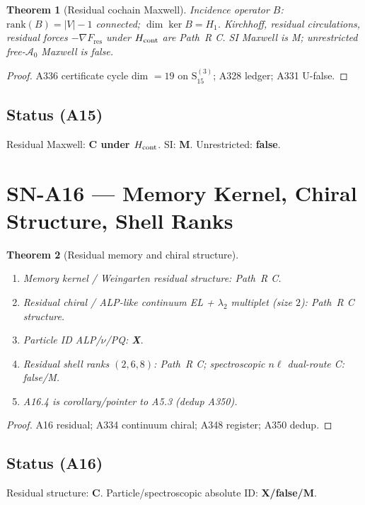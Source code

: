\documentclass[11pt,a4paper]{article}
\newtheorem{theorem}{Theorem}[section]
\theoremstyle{definition}
\begin{document}
\begin{theorem}[Residual cochain Maxwell]
\label{thm:A15}
Incidence operator $B$: $\mathrm{rank}(B)=|V|-1$ connected; $\dim\ker B=H_1$.
Kirchhoff, residual circulations, residual forces $-\nabla F_{\mathrm{res}}$ under $H_{\rm cont}$ are Path~R C.
SI Maxwell is M; unrestricted free-$\mathcal{A}_0$ Maxwell is false.
\end{theorem}

\begin{proof}
A336 certificate cycle dim $=19$ on $\mathrm{S}_{15}^{(3)}$; A328 ledger; A331 U-false.
\end{proof}

\subsection*{Status (A15)} Residual Maxwell: \textbf{C under $H_{\rm cont}$}. SI: \textbf{M}. Unrestricted: \textbf{false}.

\section{SN-A16 --- Memory Kernel, Chiral Structure, Shell Ranks}
\label{sec:SNA16}

\begin{theorem}[Residual memory and chiral structure]
\label{thm:A16}
\begin{enumerate}[label=(\roman*)]
\item Memory kernel / Weingarten residual structure: Path~R C.
\item Residual chiral / ALP-\emph{like} continuum EL + $\lambda_2$ multiplet (size $2$): Path~R C structure.
\item Particle ID ALP/$\nu$/PQ: \textbf{X}.
\item Residual shell ranks $(2,6,8)$: Path~R C; spectroscopic $n\ell$ dual-route C: false/M.
\item A16.4 is corollary/pointer to A5.3 (dedup A350).
\end{enumerate}
\end{theorem}

\begin{proof}
A16 residual; A334 continuum chiral; A348 register; A350 dedup.
\end{proof}

\subsection*{Status (A16)} Residual structure: \textbf{C}. Particle/spectroscopic absolute ID: \textbf{X/false/M}.
\end{document}
